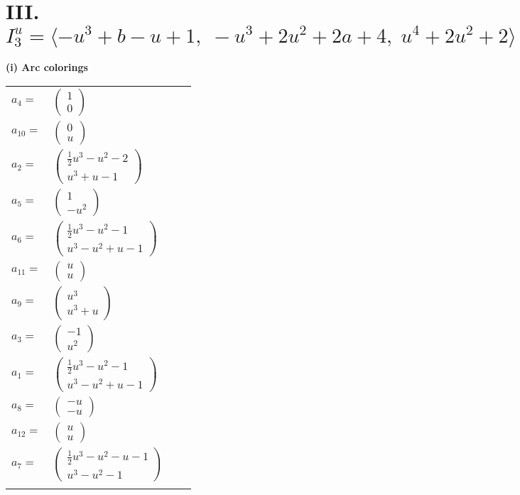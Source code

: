 \documentclass[1p]{elsarticle_modified}
\theoremstyle{definition}
\begin{document}
\centering \section*{III. $I^u_{3}= \langle - u^3+b- u+1,\;- u^3+2 u^2+2 a+4,\;u^4+2 u^2+2 \rangle$}
\flushleft \textbf{(i) Arc colorings}\\
\begin{tabular}{m{7pt} m{180pt} m{7pt} m{180pt} }
\flushright $a_{4}=$&$\begin{pmatrix}1\\0\end{pmatrix}$ \\
\flushright $a_{10}=$&$\begin{pmatrix}0\\u\end{pmatrix}$ \\
\flushright $a_{2}=$&$\begin{pmatrix}\frac{1}{2} u^3- u^2-2\\u^3+u-1\end{pmatrix}$ \\
\flushright $a_{5}=$&$\begin{pmatrix}1\\- u^2\end{pmatrix}$ \\
\flushright $a_{6}=$&$\begin{pmatrix}\frac{1}{2} u^3- u^2-1\\u^3- u^2+u-1\end{pmatrix}$ \\
\flushright $a_{11}=$&$\begin{pmatrix}u\\u\end{pmatrix}$ \\
\flushright $a_{9}=$&$\begin{pmatrix}u^3\\u^3+u\end{pmatrix}$ \\
\flushright $a_{3}=$&$\begin{pmatrix}-1\\u^2\end{pmatrix}$ \\
\flushright $a_{1}=$&$\begin{pmatrix}\frac{1}{2} u^3- u^2-1\\u^3- u^2+u-1\end{pmatrix}$ \\
\flushright $a_{8}=$&$\begin{pmatrix}- u\\- u\end{pmatrix}$ \\
\flushright $a_{12}=$&$\begin{pmatrix}u\\u\end{pmatrix}$ \\
\flushright $a_{7}=$&$\begin{pmatrix}\frac{1}{2} u^3- u^2- u-1\\u^3- u^2-1\end{pmatrix}$\\&\end{tabular}
\end{document}
